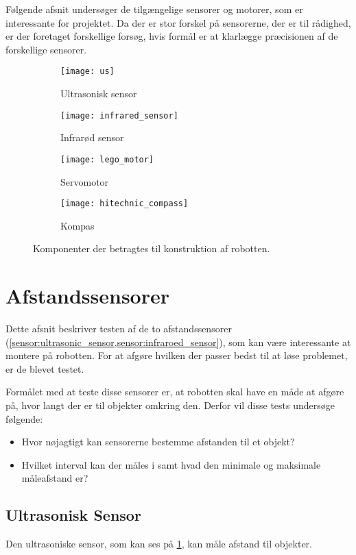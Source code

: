 \label{sensorer}
Følgende afsnit undersøger de tilgængelige sensorer og motorer, som er interessante for projektet.
Da der er stor forskel på sensorerne, der er til rådighed, er der foretaget forskellige forsøg, hvis formål er at klarlægge præcisionen af de forskellige sensorer.

\begin{figure}[h]
\centering
\begin{subfigure}[b]{.4\textwidth}
\centering
\texttt{[image: us]}
\caption{Ultrasonisk sensor}
\label{sensor:ultrasonic_sensor}
\end{subfigure}
\begin{subfigure}[b]{.4\textwidth}
\centering
\texttt{[image: infrared\_sensor]}
\caption{Infrarød sensor}
\label{sensor:infraroed_sensor}
\end{subfigure}
\begin{subfigure}[b]{.4\textwidth}
\centering
\texttt{[image: lego\_motor]}
\caption{Servomotor}
\label{sensor:servo_motor}
\end{subfigure}
\begin{subfigure}[b]{.4\textwidth}
\centering
\texttt{[image: hitechnic\_compass]}
\caption{Kompas}
\label{sensor:compass}
\end{subfigure}
\caption{Komponenter der betragtes til konstruktion af robotten.}
\end{figure}

\section{Afstandssensorer}
Dette afsnit beskriver testen af de to afstandssensorer (\cref{sensor:ultrasonic_sensor,sensor:infraroed_sensor}), som kan være interessante at montere på robotten.
For at afgøre hvilken der passer bedst til at løse problemet, er de blevet testet.

Formålet med at teste disse sensorer er, at robotten skal have en måde at afgøre på, hvor langt der er til objekter omkring den.
Derfor vil disse tests undersøge følgende:
\begin{itemize}
\item Hvor nøjagtigt kan sensorerne bestemme afstanden til et objekt?
\item Hvilket interval kan der måles i samt hvad den minimale og maksimale måleafstand er?
\end{itemize}

\subsection{Ultrasonisk Sensor}
Den ultrasoniske sensor, som kan ses på \cref{sensor:ultrasonic_sensor}, kan måle afstand til objekter.

